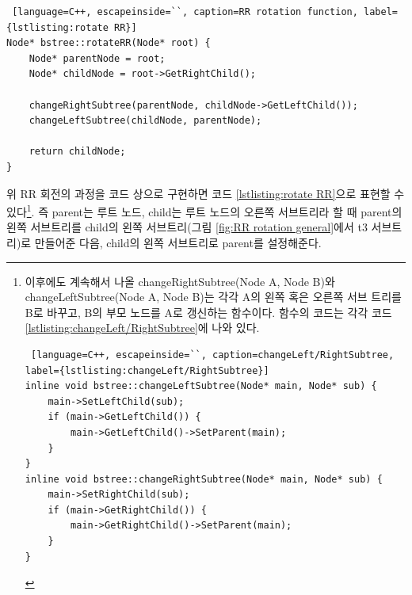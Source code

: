 \documentclass{article}
\begin{document}
\begin{lstlisting} [language=C++, escapeinside=``, caption=RR rotation function, label={lstlisting:rotate RR}]
Node* bstree::rotateRR(Node* root) {
	Node* parentNode = root;
	Node* childNode = root->GetRightChild();

	changeRightSubtree(parentNode, childNode->GetLeftChild());
	changeLeftSubtree(childNode, parentNode);

	return childNode;
}
\end{lstlisting}

위 RR 회전의 과정을 코드 상으로 구현하면 코드 \ref{lstlisting:rotate RR}으로 표현할 수 있다\cprotect\footnote{이후에도 계속해서 나올 changeRightSubtree(Node A, Node B)와 changeLeftSubtree(Node A, Node B)는 각각 A의 왼쪽 혹은 오른쪽 서브 트리를 B로 바꾸고, B의 부모 노드를 A로 갱신하는 함수이다. 함수의 코드는 각각 코드 \ref{lstlisting:changeLeft/RightSubtree}에 나와 있다.
\begin{lstlisting} [language=C++, escapeinside=``, caption=changeLeft/RightSubtree, label={lstlisting:changeLeft/RightSubtree}]
inline void bstree::changeLeftSubtree(Node* main, Node* sub) {
	main->SetLeftChild(sub);
	if (main->GetLeftChild()) {
		main->GetLeftChild()->SetParent(main);
	}
}
inline void bstree::changeRightSubtree(Node* main, Node* sub) {
	main->SetRightChild(sub);
	if (main->GetRightChild()) {
		main->GetRightChild()->SetParent(main);
	}
}
\end{lstlisting}}. 즉 parent는 루트 노드, child는 루트 노드의 오른쪽 서브트리라 할 때 parent의 왼쪽 서브트리를 child의 왼쪽 서브트리(그림 \ref{fig:RR rotation general}에서 t3 서브트리)로 만들어준 다음, child의 왼쪽 서브트리로 parent를 설정해준다.
\end{document}
